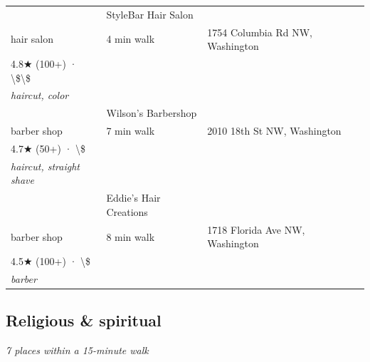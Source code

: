 \documentclass[11pt,a4paper]{article}
\begin{document}
{\begin{longtable}{@{}p{0.5cm}p{6.5cm}p{2.5cm}p{6.5cm}@{}}
\addlinespace[2pt]
5 & StyleBar Hair Salon \\ \textcolor{brandmuted}{\footnotesize hair salon} & 4 min walk & \textcolor{brandmuted}{\footnotesize 1754 Columbia Rd NW,  Washington} \\ 4.8★ (100+) · \textbackslash{}\$\textbackslash{}\$ \\ \textit{haircut, color} \\
\addlinespace[2pt]
6 & Wilson's Barbershop \\ \textcolor{brandmuted}{\footnotesize barber shop} & 7 min walk & \textcolor{brandmuted}{\footnotesize 2010 18th St NW,  Washington} \\ 4.7★ (50+) · \textbackslash{}\$ \\ \textit{haircut, straight shave} \\
\addlinespace[2pt]
7 & Eddie's Hair Creations \\ \textcolor{brandmuted}{\footnotesize barber shop} & 8 min walk & \textcolor{brandmuted}{\footnotesize 1718 Florida Ave NW,  Washington} \\ 4.5★ (100+) · \textbackslash{}\$ \\ \textit{barber} \\
\bottomrule
\end{longtable}
}
\clearpage

\subsection{Religious \& spiritual}

\noindent\textit{7 places within a 15-minute walk}
\end{document}

